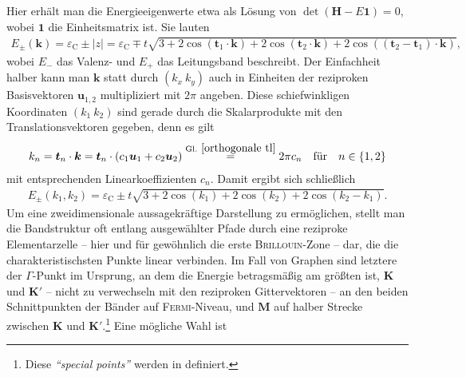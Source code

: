 \documentclass[a4paper, 10pt, twoside, openany]{book} %
\newcommand \braces[1]{\left \lbrace #1 \right \rbrace}
\def \vec {\boldsymbol}
\def \eC {\varepsilon_\mathrm{C}}
\begin{document}
	Hier erhält man die Energieeigenwerte etwa als Lösung von $\det(\vec H - E \vec 1) = 0$, wobei $\vec 1$ die Einheitsmatrix ist. Sie lauten
	\begin{align*}
		E_\pm(\vec k) = \eC \pm |z| = \eC \mp t \sqrt{3 + 2 \cos(\vec t_1 \cdot \vec k) + 2 \cos(\vec t_2 \cdot \vec k) + 2 \cos((\vec t_2 - \vec t_1) \cdot \vec k)},
	\end{align*}
    wobei $E_-$ das Valenz- und $E_+$ das Leitungsband beschreibt. Der Einfachheit halber kann man $\vec k$ statt durch $(k_x \ k_y)$ auch in Einheiten der reziproken Basisvektoren $\vec u_{1, 2}$ multipliziert mit $2 \pi$ angeben. Diese schiefwinkligen Koordinaten $(k_1 \ k_2)$ sind gerade durch die Skalarprodukte mit den Translationsvektoren gegeben, denn es gilt
	\begin{align}
		k_n = \vec t_n \cdot \vec k = \vec t_n \cdot (c_1 \vec u_1 + c_2 \vec u_2) \overset{\rm Gl.~\ref{orthogonale tl}} = 2 \pi c_n \quad \text{für} \quad n \in \braces{1, 2}
		\label{Koordinaten}
	\end{align}
	mit entsprechenden Linearkoeffizienten $c_n$. Damit ergibt sich schließlich
	\begin{align}
		E_\pm(k_1, k_2) = \eC \pm t \sqrt{3 + 2 \cos(k_1) + 2 \cos(k_2) + 2 \cos(k_2 - k_1)}.
		\label{Eigenenergien Graphen}
	\end{align}
	Um eine zweidimensionale aussagekräftige Darstellung zu ermöglichen, stellt man die Bandstruktur oft entlang ausgewählter Pfade durch eine reziproke Elementarzelle -- hier und für gewöhnlich die erste \textsc{Brillouin}-Zone -- dar, die die charakteristischsten Punkte linear verbinden.
	Im Fall von Graphen sind letztere der $\vec \varGamma$-Punkt im Ursprung, an dem die Energie betragsmäßig am größten ist, $\vec K$ und $\vec K'$ -- nicht zu verwechseln mit den reziproken Gittervektoren -- an den beiden Schnittpunkten der Bänder auf \textsc{Fermi}-Niveau, und $\vec M$ auf halber Strecke zwischen $\vec K$ und $\vec K'$.\footnote{Diese \emph{"`special points"'} werden in \cite[S.~6]{Katsnelson1} definiert.} Eine mögliche Wahl ist
\end{document}
